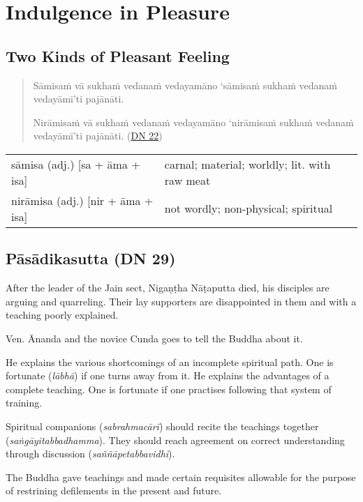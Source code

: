 \documentclass[11pt,oneside]{memoir}
\begin{document}
\normalArrayStrech

\chapter{Indulgence in Pleasure}
\label{sec:org5e0f134}
\section{Two Kinds of Pleasant Feeling}
\label{sec:org5c37e7f}

\begin{quote}
Sāmisaṁ vā sukhaṁ vedanaṁ vedayamāno ‘sāmisaṁ sukhaṁ vedanaṁ vedayāmī’ti pajānāti.

Nirāmisaṁ vā sukhaṁ vedanaṁ vedayamāno ‘nirāmisaṁ sukhaṁ vedanaṁ vedayāmī’ti pajānāti. (\href{https://suttacentral.net/dn22/pli/ms}{DN 22})
\end{quote}

\begin{longtable}{L{\colOne} L{\colTwo}}
sāmisa (adj.) [sa + āma + isa] & carnal; material; worldly; lit. with raw meat\\[0pt]
nirāmisa (adj.) [nir + āma + isa] & not wordly; non-physical; spiritual\\[0pt]
\end{longtable}

\section{Pāsādikasutta (DN 29)}
\label{sec:orga7d98bd}

After the leader of the Jain sect, Nigaṇṭha Nāṭaputta died, his disciples are
arguing and quarreling. Their lay supporters are disappointed in them and with a
teaching poorly explained.

Ven. Ānanda and the novice Cunda goes to tell the Buddha about it.

He explains the various shortcomings of an incomplete spiritual path. One is fortunate
(\emph{lābhā}) if one turns away from it. He explains the advantages of a complete
teaching. One is fortunate if one practises following that system of training.

Spiritual companions (\emph{sabrahmacārī}) should recite the teachings together
(\emph{saṅgāyitabbadhamma}). They should reach agreement on correct understanding
through discussion (\emph{saññāpetabbavidhi}).

The Buddha gave teachings and made certain requisites allowable for the purpose of
restrining defilements in the present and future.
\end{document}
